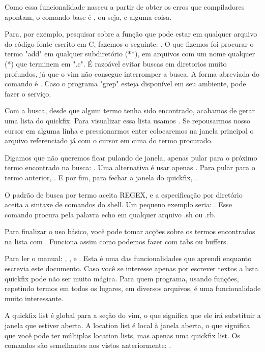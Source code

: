 \documentclass[a4paper, 12pt]{article}
\begin{document}
Como essa funcionalidade nasceu a partir de obter os erros que compiladores apontam, o comando base é , ou seja,
c alguma coisa.

Para, por exemplo, pesquisar sobre a função  que pode estar em qualquer
arquivo do código fonte escrito em C, fazemos o seguinte: .
O que fizemos foi procurar o termo "add" em qualquer subdiretório (**), em arquivos com um nome qualquer (*)
que terminem em ".c".
É razoável evitar buscas em diretorios muito profundos, já que o vim não consegue interromper a busca.
A forma abreviada do comando  é .
Caso o programa "grep" esteja disponível em seu ambiente,  pode fazer o serviço.

Com a busca, desde que algum termo tenha sido encontrado, acabamos de gerar uma lista do quickfix.
Para visualizar essa lista usamos .
Se repousarmos nosso cursor em alguma linha e pressionarmos enter colocaremos na janela principal o arquivo referenciado
já com o cursor em cima do termo procurado.

Digamos que não queremos ficar pulando de janela, apenas pular para o próximo termo encontrado na busca: .
Uma alternativa é usar apenas . 
Para pular para o termo anterior, .
E por fim, para fechar a janela do quickfix, .

O padrão de busca por termo aceita REGEX, e a especificação por diretório aceita a sintaxe de comandos do shell.
Um pequeno exemplo seria: .
Esse comando procura pela palavra echo em qualquer arquivo .sh ou .rb.

Para finalizar o uso básico, você pode tomar acções sobre os termos encontrados na lista com .
Funciona assim como podemos fazer com tabs ou buffers.

Para ler o manual: , ,  e .
Esta é uma das funcionalidades que aprendi enquanto escrevia este documento.
Caso você se interesse apenas por escrever textos a lista quickfix pode não ser muito mágica.
Para quem programa, usando funções, repetindo termos em todos os lugares, em diversos arquivos,
é uma funcionalidade muito interessante.

A quickfix list é global para a seção do vim, o que significa que ele irá substituir a janela que estiver aberta.
A location list é local à janela aberta, o que significa que você pode ter múltiplas location lists, mas apenas uma quickfix list.
Os comandos são semelhantes aos vistos anteriormente:    .
\end{document}
